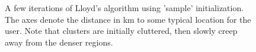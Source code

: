 \begin{figure} %
	\centering
	\caption{A few iterations of Lloyd's algorithm using 'sample' initialization. The axes denote the distance in km to some typical location for the user. Note that clusters are initially cluttered, then slowly creep away from the denser regions.}
	\label{fig:lloyds_convergence_sample}
\end{figure}
